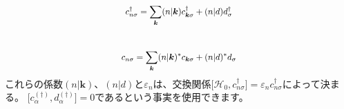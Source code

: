 \documentclass[a4j]{jarticle}
\begin{document}
\begin{align}
	\hspace{49mm}
	c^{\dagger}_{n \sigma}
	=
	\sum_{\bm{k}}
	( n | \bm{k} )
	c^{\dagger}_{\bm{k} \sigma}
	+
	( n | d )
	d^{\dagger}_{\sigma}
	\hspace{49mm}
\end{align}
\\[-12mm]
\begin{align}
	\hspace{47.4mm}
	c_{n \sigma}
	=
	\sum_{\bm{k}}
	( n | \bm{k} )^{*}
	c_{\bm{k} \sigma}
	+
	( n | d )^{*}
	d_{\sigma}
	\hspace{47.2mm}
\end{align}
これらの係数$( n | \bm{k} )$、$( n | d )$と$\varepsilon_{n}$は、交換関係$\displaystyle \big[ \mathcal{H}_{0} , c^{\dagger}_{n \sigma} \big] = \varepsilon_{n} c^{\dagger}_{n \sigma} $によって決まる。
$
	\big[
		c^{(\dagger)}_{\alpha},d^{(\dagger)}_{\alpha}
		\big]
	=
	0$であるという事実を使用できます。
\end{document}
